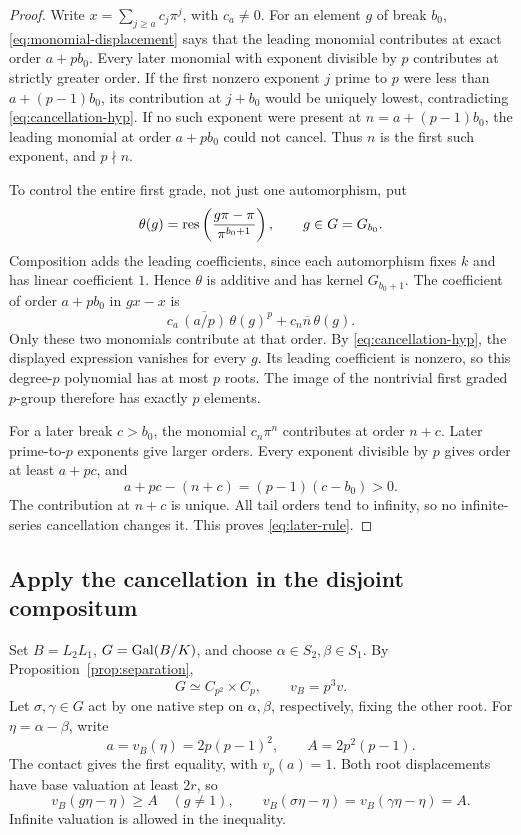 \begin{proof}
Write \(x=\sum_{j\ge a}c_j\pi^j\), with \(c_a\ne0\).
For an element \(g\) of break \(b_0\),
\eqref{eq:monomial-displacement} says that the leading
monomial contributes at exact order \(a+p b_0\).
Every later monomial with exponent divisible by \(p\)
contributes at strictly greater order.
If the first nonzero exponent \(j\) prime to \(p\) were
less than \(a+(p-1)b_0\), its contribution at \(j+b_0\)
would be uniquely lowest, contradicting
\eqref{eq:cancellation-hyp}.
If no such exponent were present at \(n=a+(p-1)b_0\),
the leading monomial at order \(a+p b_0\) could not cancel.
Thus \(n\) is the first such exponent, and \(p\nmid n\).

To control the entire first grade, not just one automorphism, put
\[
 \theta(g)=\operatorname{res}\left(\frac{g\pi-\pi}{\pi^{b_0+1}}\right),
 \qquad g\in G=G_{b_0}.
\]
Composition adds the leading coefficients, since each
automorphism fixes \(k\) and has linear coefficient \(1\).
Hence \(\theta\) is additive and has kernel \(G_{b_0+1}\).
The coefficient of order \(a+p b_0\) in \(gx-x\) is
\[
 c_a\,\overline{(a/p)}\,\theta(g)^p
 +c_n\overline n\,\theta(g).
\]
Only these two monomials contribute at that order.
By \eqref{eq:cancellation-hyp}, the displayed expression
vanishes for every \(g\). Its leading coefficient is nonzero,
so this degree-\(p\) polynomial has at most \(p\) roots.
The image of the nontrivial first graded \(p\)-group therefore
has exactly \(p\) elements.

For a later break \(c>b_0\), the monomial \(c_n\pi^n\)
contributes at order \(n+c\). Later prime-to-\(p\) exponents
give larger orders. Every exponent divisible by \(p\)
gives order at least \(a+pc\), and
\[
 a+pc-(n+c)=(p-1)(c-b_0)>0.
\]
The contribution at \(n+c\) is unique. All tail orders tend
to infinity, so no infinite-series cancellation changes it.
This proves \eqref{eq:later-rule}.
\end{proof}

\subsection{Apply the cancellation in the disjoint compositum}

Set \(B=L_2L_1\), \(G=\operatorname{Gal}(B/K)\), and choose
\(\alpha\in S_2,\beta\in S_1\). By
Proposition~\ref{prop:separation},
\[
 G\simeq C_{p^2}\times C_p,\qquad v_B=p^3v.
\]
Let \(\sigma,\gamma\in G\) act by one native step on
\(\alpha,\beta\), respectively, fixing the other root.
For \(\eta=\alpha-\beta\), write
\begin{equation}\label{eq:a-A}
 a=v_B(\eta)=2p(p-1)^2,\qquad A=2p^2(p-1).
\end{equation}
The contact gives the first equality, with \(v_p(a)=1\).
Both root displacements have base valuation at least \(2r\),
so
\begin{equation}\label{eq:uniform-displ}
 v_B(g\eta-\eta)\ge A\quad(g\ne1),\qquad
 v_B(\sigma\eta-\eta)=v_B(\gamma\eta-\eta)=A.
\end{equation}
Infinite valuation is allowed in the inequality.

